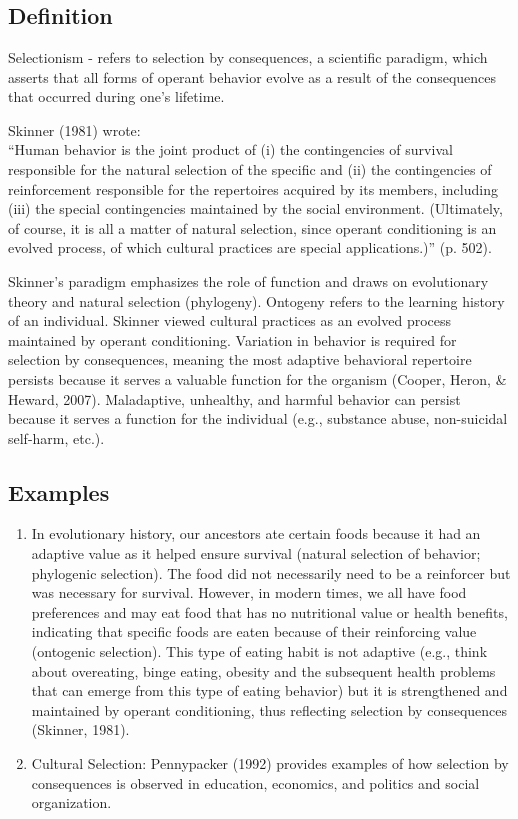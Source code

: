 \section{\fourFKTwo{}}
\subsection{Definition} 
Selectionism - refers to selection by consequences, a scientific paradigm, which asserts that all forms of operant behavior evolve as a result of the consequences that occurred during one's lifetime.

Skinner (1981) wrote:\\

``Human behavior is the joint product of (i) the contingencies of survival responsible for the natural selection of the specific and (ii) the contingencies of reinforcement responsible for the repertoires acquired by its members, including (iii) the special contingencies maintained by the social environment. (Ultimately, of course, it is all a matter of natural selection, since operant conditioning is an evolved process, of which cultural practices are special applications.)'' (p. 502).  

Skinner's paradigm emphasizes the role of function and draws on evolutionary theory and natural selection (phylogeny). Ontogeny refers to the learning history of an individual. Skinner viewed cultural practices as an evolved process maintained by operant conditioning. Variation in behavior is required for selection by consequences, meaning the most adaptive behavioral repertoire persists because it serves a valuable function for the organism (Cooper, Heron, \& Heward, 2007). Maladaptive, unhealthy, and harmful behavior can persist because it serves a function for the individual (e.g., substance abuse, non-suicidal self-harm, etc.).

\subsection{Examples}
\begin{enumerate}
\item In evolutionary history, our ancestors ate certain foods because it had an adaptive value as it helped ensure survival (natural selection of behavior; phylogenic selection).  The food did not necessarily need to be a reinforcer but was necessary for survival.  However, in modern times, we all have food preferences and may eat food that has no nutritional value or health benefits, indicating that specific foods are eaten because of their reinforcing value (ontogenic selection).  This type of eating habit is not adaptive (e.g., think about overeating, binge eating, obesity and the subsequent health problems that can emerge from this type of eating behavior) but it is strengthened and maintained by operant conditioning, thus reflecting selection by consequences (Skinner, 1981).  
\item Cultural Selection: Pennypacker (1992) provides examples of how selection by consequences is observed in education, economics, and politics and social organization. 
%
\end{enumerate}
%
